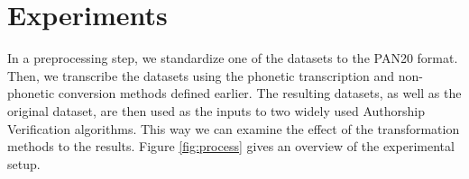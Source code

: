 \chapter{Experiments}\label{experiments}
In a preprocessing step, we standardize one of the datasets to the PAN20 format.
Then, we transcribe the datasets using the phonetic transcription and non-phonetic conversion methods defined earlier.
The resulting datasets, as well as the original dataset, are then used as the inputs to two widely used Authorship Verification algorithms.
This way we can examine the effect of the transformation methods to the results.
Figure \ref{fig:process} gives an overview of the experimental setup.





